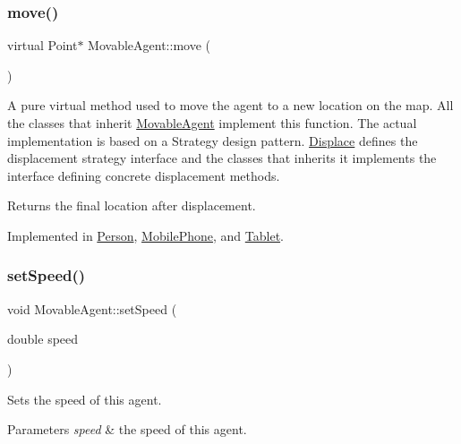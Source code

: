 \subsubsection{\texorpdfstring{move()}{move()}}
{\footnotesize\ttfamily virtual Point$\ast$ Movable\+Agent\+::move (\begin{DoxyParamCaption}{ }\end{DoxyParamCaption})\hspace{0.3cm}{\ttfamily [pure virtual]}}

A pure virtual method used to move the agent to a new location on the map. All the classes that inherit \hyperlink{class_movable_agent}{Movable\+Agent} implement this function. The actual implementation is based on a Strategy design pattern. \hyperlink{class_displace}{Displace} defines the displacement strategy interface and the classes that inherits it implements the interface defining concrete displacement methods. \begin{DoxyReturn}{Returns}
the final location after displacement. 
\end{DoxyReturn}


Implemented in \hyperlink{class_person_a922e0462a1e7eac6523a9a864ce27afc}{Person}, \hyperlink{class_mobile_phone_a785d0cac08252386603c702ad8f38c5b}{Mobile\+Phone}, and \hyperlink{class_tablet_ab1b8c7591be0c6ea118c8ab1c17839bb}{Tablet}.

\mbox{\label{class_movable_agent_ae2ef452e81789a4370e7dee32a9cc67e}} 
\subsubsection{\texorpdfstring{set\+Speed()}{setSpeed()}}
{\footnotesize\ttfamily void Movable\+Agent\+::set\+Speed (\begin{DoxyParamCaption}\item[{double}]{speed }\end{DoxyParamCaption})}

Sets the speed of this agent. 
\begin{DoxyParams}{Parameters}
{\em speed} & the speed of this agent. \\
\hline
\end{DoxyParams}
\mbox{\label{class_movable_agent_a1dee2a6bf93f01006fadfb6fba6c9a59}} 
